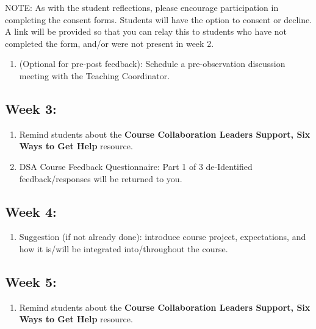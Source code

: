 \documentclass[
]{book}
\providecommand{\tightlist}{%
  \setlength{\itemsep}{0pt}\setlength{\parskip}{0pt}}
\begin{document}
NOTE: As with the student reflections, please encourage participation in completing the consent forms. Students will have the option to consent or decline. A link will be provided so that you can relay this to students who have not completed the form, and/or were not present in week 2.

\begin{enumerate}
\def\labelenumi{\arabic{enumi})}
\setcounter{enumi}{3}
\tightlist
\item
  (Optional for pre-post feedback): Schedule a pre-observation discussion meeting with the Teaching Coordinator.
\end{enumerate}

\subsection{Week 3:}\label{week-3}

\begin{enumerate}
\def\labelenumi{\arabic{enumi})}
\item
  Remind students about the \textbf{Course Collaboration Leaders Support, Six Ways to Get Help} resource.
\item
  DSA Course Feedback Questionnaire: Part 1 of 3 de-Identified feedback/responses will be returned to you.
\end{enumerate}

\subsection{Week 4:}\label{week-4}

\begin{enumerate}
\def\labelenumi{\arabic{enumi})}
\tightlist
\item
  Suggestion (if not already done): introduce course project, expectations, and how it is/will be integrated into/throughout the course.
\end{enumerate}

\subsection{Week 5:}\label{week-5}

\begin{enumerate}
\def\labelenumi{\arabic{enumi})}
\tightlist
\item
  Remind students about the \textbf{Course Collaboration Leaders Support, Six Ways to Get Help} resource.
\end{enumerate}
\end{document}
